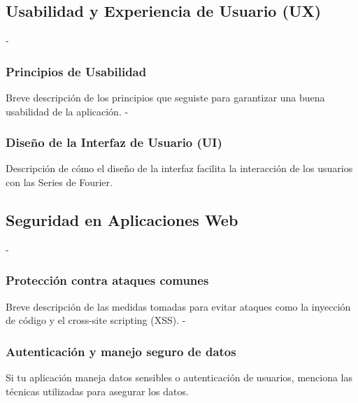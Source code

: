 \subsection{Usabilidad y Experiencia de Usuario (UX)}
- \subsubsection{Principios de Usabilidad}
Breve descripción de los principios que seguiste para garantizar una buena usabilidad de la aplicación.
- \subsubsection{Diseño de la Interfaz de Usuario (UI)}
Descripción de cómo el diseño de la interfaz facilita la interacción de los usuarios con las Series de Fourier.

\subsection{Seguridad en Aplicaciones Web}
- \subsubsection{Protección contra ataques comunes}
Breve descripción de las medidas tomadas para evitar ataques como la inyección de código y el cross-site scripting (XSS).
- \subsubsection{Autenticación y manejo seguro de datos}
Si tu aplicación maneja datos sensibles o autenticación de usuarios, menciona las técnicas utilizadas para asegurar los datos.



%
%
